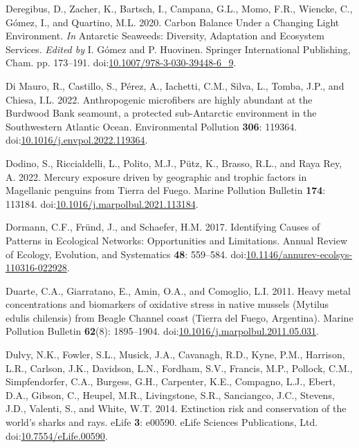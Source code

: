 \documentclass[
]{article}
\newlength{\cslhangindent}
\newenvironment{CSLReferences}[2] %
 {\begin{list}{}{%
  \setlength{\itemindent}{0pt}
  \setlength{\leftmargin}{0pt}
  \setlength{\parsep}{0pt}
  \ifodd #1
   \setlength{\leftmargin}{\cslhangindent}
   \setlength{\itemindent}{-1\cslhangindent}
  \fi
  \setlength{\itemsep}{#2\baselineskip}}}
 {\end{list}}
\begin{document}
\begin{CSLReferences}{1}{0}
Deregibus, D., Zacher, K., Bartsch, I., Campana, G.L., Momo, F.R.,
Wiencke, C., Gómez, I., and Quartino, M.L. 2020. Carbon {Balance Under}
a {Changing Light Environment}. \emph{In} Antarctic {Seaweeds}:
{Diversity}, {Adaptation} and {Ecosystem Services}. \emph{Edited by} I.
Gómez and P. Huovinen. Springer International Publishing, Cham. pp.
173--191.
doi:\href{https://doi.org/10.1007/978-3-030-39448-6_9}{10.1007/978-3-030-39448-6\_9}.

Di Mauro, R., Castillo, S., Pérez, A., Iachetti, C.M., Silva, L., Tomba,
J.P., and Chiesa, I.L. 2022. Anthropogenic microfibers are highly
abundant at the {Burdwood Bank} seamount, a protected sub-{Antarctic}
environment in the {Southwestern Atlantic Ocean}. Environmental
Pollution \textbf{306}: 119364.
doi:\href{https://doi.org/10.1016/j.envpol.2022.119364}{10.1016/j.envpol.2022.119364}.

Dodino, S., Riccialdelli, L., Polito, M.J., Pütz, K., Brasso, R.L., and
Raya Rey, A. 2022. Mercury exposure driven by geographic and trophic
factors in {Magellanic} penguins from {Tierra} del {Fuego}. Marine
Pollution Bulletin \textbf{174}: 113184.
doi:\href{https://doi.org/10.1016/j.marpolbul.2021.113184}{10.1016/j.marpolbul.2021.113184}.

Dormann, C.F., Fründ, J., and Schaefer, H.M. 2017. Identifying {Causes}
of {Patterns} in {Ecological Networks}: {Opportunities} and
{Limitations}. Annual Review of Ecology, Evolution, and Systematics
\textbf{48}: 559--584.
doi:\href{https://doi.org/10.1146/annurev-ecolsys-110316-022928}{10.1146/annurev-ecolsys-110316-022928}.

Duarte, C.A., Giarratano, E., Amin, O.A., and Comoglio, L.I. 2011. Heavy
metal concentrations and biomarkers of oxidative stress in native
mussels ({Mytilus} edulis chilensis) from {Beagle Channel} coast
({Tierra} del {Fuego}, {Argentina}). Marine Pollution Bulletin
\textbf{62}(8): 1895--1904.
doi:\href{https://doi.org/10.1016/j.marpolbul.2011.05.031}{10.1016/j.marpolbul.2011.05.031}.

Dulvy, N.K., Fowler, S.L., Musick, J.A., Cavanagh, R.D., Kyne, P.M.,
Harrison, L.R., Carlson, J.K., Davidson, L.N., Fordham, S.V., Francis,
M.P., Pollock, C.M., Simpfendorfer, C.A., Burgess, G.H., Carpenter,
K.E., Compagno, L.J., Ebert, D.A., Gibson, C., Heupel, M.R.,
Livingstone, S.R., Sanciangco, J.C., Stevens, J.D., Valenti, S., and
White, W.T. 2014. Extinction risk and conservation of the world's sharks
and rays. eLife \textbf{3}: e00590. eLife Sciences Publications, Ltd.
doi:\href{https://doi.org/10.7554/eLife.00590}{10.7554/eLife.00590}.


\end{CSLReferences}
\end{document}

